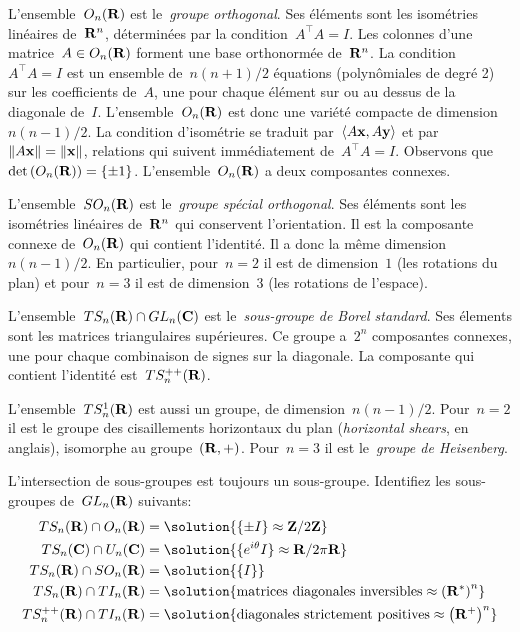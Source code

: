 L'ensemble~$O_n(\mathbf{R})$ est le~\emph{groupe orthogonal}.
Ses éléments sont les isométries linéaires de~$\mathbf{R}^n$, déterminées par la
condition~$A^\top A=I$.  Les colonnes d'une matrice~$A\in O_n(\mathbf{R})$ forment
une base orthonormée de~$\mathbf{R}^n$.  La condition~$A^\top A=I$ est un ensemble
de~$n(n+1)/2$ équations (polynômiales de degré 2) sur les coefficients
de~$A$, une pour chaque élément sur ou au dessus de la diagonale de~$I$.
L'ensemble~$O_n(\mathbf{R})$ est donc une variété compacte de dimension~$n(n-1)/2$.
La condition d'isométrie se traduit par~$\left\langle A\mathbf{x},A\mathbf{y}\right\rangle$ et
par~$\left\|A\mathbf{x}\right\|=\left\|\mathbf{x}\right\|$, relations qui suivent immédiatement de~$A^\top A=I$.
Observons que~$\textrm{det}\left(O_n(\mathbf{R})\right)=\left\{\pm 1\right\}$.
L'ensemble~$O_n(\mathbf{R})$ a deux composantes connexes.

L'ensemble~$SO_n(\mathbf{R})$ est le~\emph{groupe spécial orthogonal}.  Ses éléments
sont les isométries linéaires de~$\mathbf{R}^n$ qui conservent l'orientation.  Il est
la composante connexe de~$O_n(\mathbf{R})$ qui contient l'identité.  Il a donc la
même dimension~$n(n-1)/2$.  En particulier, pour~$n=2$ il est de
dimension~$1$ (les rotations du plan) et pour~$n=3$ il est de dimension~$3$
(les rotations de l'espace).

L'ensemble~$TS_n(\mathbf{R})\cap GL_n(\mathbf{C})$ est le~\emph{sous-groupe de Borel
standard}.  Ses élements sont les matrices triangulaires supérieures.  Ce
groupe a~$2^n$ composantes connexes, une pour chaque combinaison de signes
sur la diagonale.  La composante qui contient l'identité est~$TS_n^{++}(\mathbf{R})$.

L'ensemble~$TS^1_n(\mathbf{R})$ est aussi un groupe, de dimension~$n(n-1)/2$.
Pour~$n=2$ il est le groupe des cisaillements horizontaux du plan
(\emph{horizontal shears}, en anglais), isomorphe au groupe~$(\mathbf{R},+)$.
Pour~$n=3$ il est le~\emph{groupe de Heisenberg}.

\begin{exercice}
	L'intersection de sous-groupes est toujours un sous-groupe.  Identifiez
	les sous-groupes de~$GL_n(\mathbf{R})$ suivants:
	\begin{align*}
		TS_n(\R) \cap O_n(\R) &= \solution{\{\pm I\} \approx \Z/2\Z}\\
		TS_n(\C) \cap U_n(\C) &= \solution{\{e^{i\theta} I\} \approx \R/2\pi\R}\\
		TS_n(\R) \cap SO_n(\R) &= \solution{\{I\}} \\
		TS_n(\R) \cap TI_n(\R) &= \solution{\textrm{matrices diagonales
		inversibles} \approx \parens{\R^*}^n}\\
		TS^{++}_n(\R) \cap TI_n(\R) &= \solution{\textrm{diagonales strictement
		positives} \approx \parens{\R^+}^n}\\
	\end{align*}
\end{exercice}

